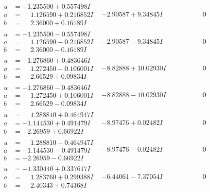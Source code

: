 \documentclass[1p]{elsarticle_modified}
\theoremstyle{definition}
\begin{document}
$$\begin{array}{c|c|c}
\begin{aligned}
u &= -1.235500 + 0.557498 I \\
a &= \phantom{-}1.126590 + 0.216852 I \\
b &= \phantom{-}2.36000 + 0.16189 I\end{aligned}
 & -2.90587 + 9.34845 I & \phantom{-0.000000 } 0 \\ \hline\begin{aligned}
u &= -1.235500 - 0.557498 I \\
a &= \phantom{-}1.126590 - 0.216852 I \\
b &= \phantom{-}2.36000 - 0.16189 I\end{aligned}
 & -2.90587 - 9.34845 I & \phantom{-0.000000 } 0 \\ \hline\begin{aligned}
u &= -1.276860 + 0.483646 I \\
a &= \phantom{-}1.272450 - 0.106001 I \\
b &= \phantom{-}2.66529 + 0.09834 I\end{aligned}
 & -8.82888 + 10.02930 I & \phantom{-0.000000 } 0 \\ \hline\begin{aligned}
u &= -1.276860 - 0.483646 I \\
a &= \phantom{-}1.272450 + 0.106001 I \\
b &= \phantom{-}2.66529 - 0.09834 I\end{aligned}
 & -8.82888 - 10.02930 I & \phantom{-0.000000 } 0 \\ \hline\begin{aligned}
u &= \phantom{-}1.288810 + 0.464947 I \\
a &= -1.144530 + 0.491479 I \\
b &= -2.26959 + 0.66922 I\end{aligned}
 & -8.97476 + 0.02482 I & \phantom{-0.000000 } 0 \\ \hline\begin{aligned}
u &= \phantom{-}1.288810 - 0.464947 I \\
a &= -1.144530 - 0.491479 I \\
b &= -2.26959 - 0.66922 I\end{aligned}
 & -8.97476 - 0.02482 I & \phantom{-0.000000 } 0 \\ \hline\begin{aligned}
u &= -1.330440 + 0.337617 I \\
a &= \phantom{-}1.283760 + 0.299388 I \\
b &= \phantom{-}2.40343 + 0.74368 I\end{aligned}
 & -6.44061 - 7.37054 I & \phantom{-0.000000 } 0 \\ \hline\begin{aligned}

\end{aligned}
\end{array}$$
\end{document}
